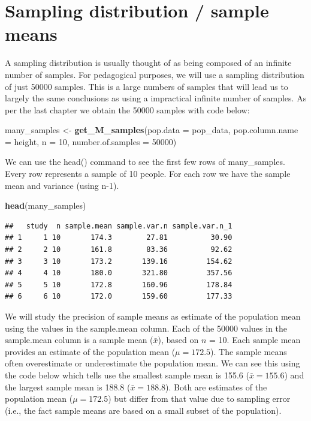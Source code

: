 \documentclass[
]{krantz}
\makeatletter
\newenvironment{Shaded}{\begin{snugshade}}{\end{snugshade}}
\newcommand{\DataTypeTok}[1]{\textcolor[rgb]{0.27,0.27,0.27}{#1}}
\newcommand{\DecValTok}[1]{\textcolor[rgb]{0.06,0.06,0.06}{#1}}
\newcommand{\KeywordTok}[1]{\textcolor[rgb]{0.27,0.27,0.27}{\textbf{#1}}}
\newcommand{\NormalTok}[1]{#1}
\newcommand{\StringTok}[1]{\textcolor[rgb]{0.5,0.5,0.5}{#1}}
\newenvironment{kframe}{%
\medskip{}
\setlength{\fboxsep}{.8em}
 \def\at@end@of@kframe{}%
 \ifinner\ifhmode%
  \def\at@end@of@kframe{\end{minipage}}%
  \begin{minipage}{\columnwidth}%
 \fi\fi%
 \def\FrameCommand##1{\hskip\@totalleftmargin \hskip-\fboxsep
 \colorbox{shadecolor}{##1}\hskip-\fboxsep
     \hskip-\linewidth \hskip-\@totalleftmargin \hskip\columnwidth}%
 \MakeFramed {\advance\hsize-\width
   \@totalleftmargin\z@ \linewidth\hsize
   \@setminipage}}%
 {\par\unskip\endMakeFramed%
 \at@end@of@kframe}
\renewenvironment{Shaded}{\begin{kframe}}{\end{kframe}}
\makeatother
\begin{document}
\hypertarget{sampling-distribution-sample-means}{%
\section{Sampling distribution / sample means}\label{sampling-distribution-sample-means}}

A sampling distribution is usually thought of as being composed of an infinite number of samples. For pedagogical purposes, we will use a sampling distribution of just 50000 samples. This is a large numbers of samples that will lead us to largely the same conclusions as using a impractical infinite number of samples. As per the last chapter we obtain the 50000 samples with code below:

\begin{Shaded}
\begin{Highlighting}[]
\NormalTok{many_samples <-}\StringTok{ }\KeywordTok{get_M_samples}\NormalTok{(}\DataTypeTok{pop.data =}\NormalTok{ pop_data, }
                              \DataTypeTok{pop.column.name =}\NormalTok{ height,}
                              \DataTypeTok{n =} \DecValTok{10}\NormalTok{,}
                              \DataTypeTok{number.of.samples =} \DecValTok{50000}\NormalTok{)}
\end{Highlighting}
\end{Shaded}

We can use the head() command to see the first few rows of many\_samples. Every row represents a sample of 10 people. For each row we have the sample mean and variance (using n-1).

\begin{Shaded}
\begin{Highlighting}[]
\KeywordTok{head}\NormalTok{(many_samples)}
\end{Highlighting}
\end{Shaded}

\begin{verbatim}
##   study  n sample.mean sample.var.n sample.var.n_1
## 1     1 10       174.3        27.81          30.90
## 2     2 10       161.8        83.36          92.62
## 3     3 10       173.2       139.16         154.62
## 4     4 10       180.0       321.80         357.56
## 5     5 10       172.8       160.96         178.84
## 6     6 10       172.0       159.60         177.33
\end{verbatim}

We will study the precision of sample means as estimate of the population mean using the values in the sample.mean column. Each of the 50000 values in the sample.mean column is a sample mean (\(\bar{x}\)), based on \(n\) = 10. Each sample mean provides an estimate of the population mean (\(\mu = 172.5\)). The sample means often overestimate or underestimate the population mean. We can see this using the code below which tells use the smallest sample mean is 155.6 (\(\bar{x} = 155.6\)) and the largest sample mean is 188.8 (\(\bar{x} = 188.8\)). Both are estimates of the population mean (\(\mu = 172.5\)) but differ from that value due to sampling error (i.e., the fact sample means are based on a small subset of the population).
\end{document}
